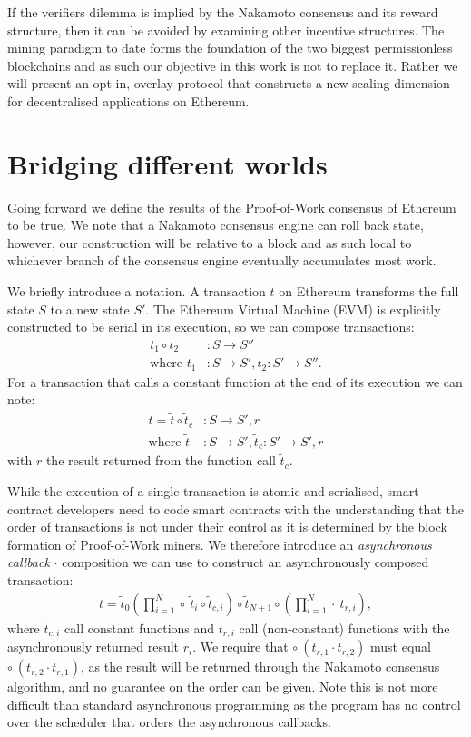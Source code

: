 \documentclass[twocolumn]{article}
\begin{document}
If the verifiers dilemma is implied by the Nakamoto consensus and its reward structure, then it can be avoided by examining other incentive structures.  The mining paradigm to date forms the foundation of the two biggest permissionless blockchains %
and as such our objective in this work is not to replace it.  Rather we will present an opt-in, overlay protocol that constructs a new scaling dimension for decentralised applications on Ethereum.


\section{Bridging different worlds}

Going forward we define the results of the Proof-of-Work consensus of Ethereum to be true.  We note that a Nakamoto consensus engine can roll back state, however, our construction will be relative to a block and as such local to whichever branch of the consensus engine eventually accumulates most work.

We briefly introduce a notation. A transaction $t$ on Ethereum transforms the full state $S$ to a new state $S'$.  The Ethereum Virtual Machine (EVM) is explicitly constructed to be serial in its execution, so we can compose transactions:
\begin{align}
	t_1 \circ t_2&: S \rightarrow S'' \\
	\text{where } t_1&: S \rightarrow S',
	t_2: S' \rightarrow S''. \nonumber
\end{align}
For a transaction that calls a constant function at the end of its execution we can note:
\begin{align}
	t = \tilde{t} \circ \tilde{t}_c&: S \rightarrow S', r \\
	\text{where } \tilde{t}&: S \rightarrow S', \tilde{t}_c: S' \rightarrow S', r \nonumber
\end{align}
with $r$ the result returned from the function call $\tilde{t}_c$.

While the execution of a single transaction is atomic and serialised, smart contract developers need to code smart contracts with the understanding that the order of transactions is not under their control as it is determined by the block formation of Proof-of-Work miners.  We therefore introduce an \textit{asynchronous callback} $\cdot$ composition we can use to construct an asynchronously composed transaction:
\begin{align} \label{GeneralTransaction}
	t = \tilde{t}_0 \left(\prod_{i=1}^{N} \circ \ \tilde{t}_i \circ \tilde{t}_{c, i} \right) \circ \tilde{t}_{N+1} \circ \left(\prod_{i=1}^N \cdot \ t_{r, i}\right),
\end{align}
where $\tilde{t}_{c, i}$ call constant functions and $t_{r, i}$ call (non-constant) functions with the asynchronously returned result $r_i$.  We require that $\circ \ ( t_{r, 1} \cdot t_{r, 2} )$ must equal $\circ \ ( t_{r, 2} \cdot t_{r, 1} )$, as the result will be returned through the Nakamoto consensus algorithm, and no guarantee on the order can be given.  Note this is not more difficult than standard asynchronous programming as the program has no control over the scheduler that orders the asynchronous callbacks.
\end{document}
